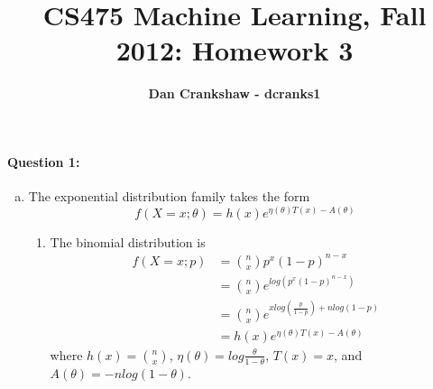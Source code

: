 \documentclass[letterpaper,11pt]{article}
\title{CS475 Machine Learning, Fall 2012: Homework 3}
\date{}
\author{\bf Dan Crankshaw - dcranks1}
\begin{document}
\maketitle


\paragraph{Question 1:}
\begin{enumerate}[(a)]
\item  The exponential distribution family takes the form
  \begin{equation}
  f(X=x;\theta) = h(x) e^{\eta(\theta) T(x) - A(\theta)}
  \end{equation}
\begin{enumerate}[(1)]
\item
  The binomial distribution is
  \begin{align}
  f(X=x;p) & = \binom{n}{x} p^x (1-p)^{n-x}\\
           & = \binom{n}{x} e^{log(p^x (1-p)^{n-x})}\\
           & = \binom{n}{x} e^{x log(\frac{p}{1-p}) + nlog(1-p)}\\
           & = h(x) e^{\eta(\theta) T(x) - A(\theta)}
  \end{align}
 where $h(x) = \binom{n}{x}$, $\eta(\theta) = log \frac{\theta}{1 - \theta}$, $T(x) = x$, and $A(\theta) = -nlog(1-\theta)$.


\end{enumerate}
\end{enumerate}
\end{document}
